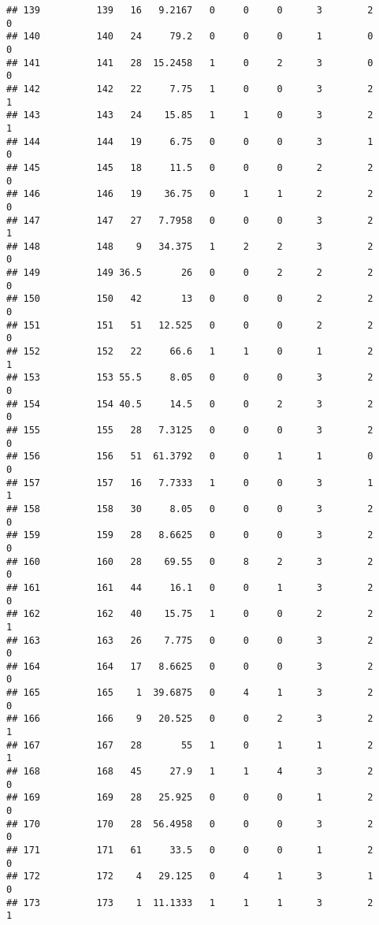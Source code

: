 \documentclass[
]{article}
\begin{document}
\begin{verbatim}
## 139          139   16   9.2167   0     0     0      3        2         0
## 140          140   24     79.2   0     0     0      1        0         0
## 141          141   28  15.2458   1     0     2      3        0         0
## 142          142   22     7.75   1     0     0      3        2         1
## 143          143   24    15.85   1     1     0      3        2         1
## 144          144   19     6.75   0     0     0      3        1         0
## 145          145   18     11.5   0     0     0      2        2         0
## 146          146   19    36.75   0     1     1      2        2         0
## 147          147   27   7.7958   0     0     0      3        2         1
## 148          148    9   34.375   1     2     2      3        2         0
## 149          149 36.5       26   0     0     2      2        2         0
## 150          150   42       13   0     0     0      2        2         0
## 151          151   51   12.525   0     0     0      2        2         0
## 152          152   22     66.6   1     1     0      1        2         1
## 153          153 55.5     8.05   0     0     0      3        2         0
## 154          154 40.5     14.5   0     0     2      3        2         0
## 155          155   28   7.3125   0     0     0      3        2         0
## 156          156   51  61.3792   0     0     1      1        0         0
## 157          157   16   7.7333   1     0     0      3        1         1
## 158          158   30     8.05   0     0     0      3        2         0
## 159          159   28   8.6625   0     0     0      3        2         0
## 160          160   28    69.55   0     8     2      3        2         0
## 161          161   44     16.1   0     0     1      3        2         0
## 162          162   40    15.75   1     0     0      2        2         1
## 163          163   26    7.775   0     0     0      3        2         0
## 164          164   17   8.6625   0     0     0      3        2         0
## 165          165    1  39.6875   0     4     1      3        2         0
## 166          166    9   20.525   0     0     2      3        2         1
## 167          167   28       55   1     0     1      1        2         1
## 168          168   45     27.9   1     1     4      3        2         0
## 169          169   28   25.925   0     0     0      1        2         0
## 170          170   28  56.4958   0     0     0      3        2         0
## 171          171   61     33.5   0     0     0      1        2         0
## 172          172    4   29.125   0     4     1      3        1         0
## 173          173    1  11.1333   1     1     1      3        2         1

\end{verbatim}
\end{document}
